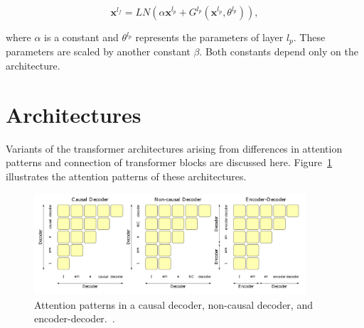 \documentclass[a4paper,oneside]{book}
\begin{document}
\begin{enumerate}
          \begin{equation}
              \mathbf{x}^{l_{f}} = LN\left(\alpha \mathbf{x}^{l_{p}}+G^{l_{p}}\left(\mathbf{x}^{l_{p}}, \theta^{l_{p}}\right)\right),
          \end{equation}

          where $\alpha$ is a constant and $\theta^{l_{p}}$ represents the parameters of layer $l_{p}$. These parameters are scaled by another constant $\beta$. Both constants depend only on the architecture.
\end{enumerate}

\section{Architectures}
Variants of the transformer architectures arising from differences in attention patterns and connection of transformer blocks are discussed here. Figure~\ref{fig:attention_patterns} illustrates the attention patterns of these architectures.

\begin{figure}[!htb]
    \centering
    \includegraphics[width=0.9\textwidth]{img/attention_patterns}
    \caption{Attention patterns in a causal decoder, non-causal decoder, and encoder-decoder.~\cite{wang2022language}.}\label{fig:attention_patterns}
\end{figure}
\end{document}
